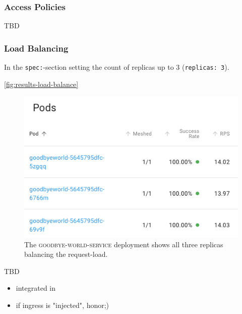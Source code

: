 \subsubsection{Access Policies}
TBD

\subsubsection{Load Balancing}
\label{sec:load-result}

In the \lstinline|spec:|-section setting the count of replicas up to 3 (\lstinline|replicas: 3|).

\autoref{fig:results-load-balance}

\begin{figure}
	\includegraphics[width=\columnwidth]{img/results-load-balance}
	\caption{The \textsc{goodbye-world-service} deployment shows all three replicas balancing the request-load.}
	\label{fig:results-load-balance}
\end{figure}

TBD
\begin{itemize}
	\item integrated in \linkerd{}
	\item if ingress is "injected", honor;)
\end{itemize}

